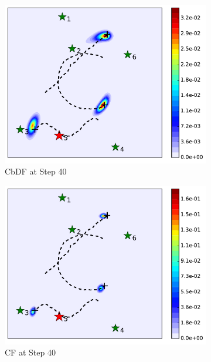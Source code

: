 	\begin{figure}%
		\centering	
		\begin{subfigure}[b]{0.23\textwidth}
			\includegraphics[width=\textwidth]{figures/cons_hetero_mov_sen_mov_tar_rbt5_step40}
			\caption{CbDF at Step 40}\label{fig:cbdf_step40}
		\end{subfigure}	
		\begin{subfigure}[b]{0.23\textwidth}
			\includegraphics[width=\textwidth]{figures/cent_hetero_mov_sen_mov_tar_rbt1_step40}
			\caption{CF at Step 40}\label{fig:cf_step40}
		\end{subfigure}
		\caption{}
	\end{figure}
	
